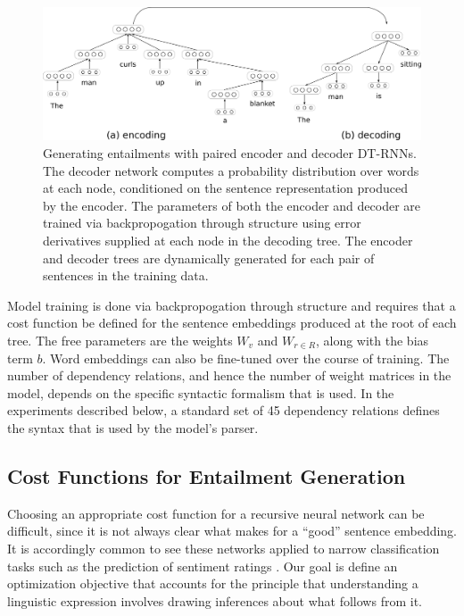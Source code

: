 \documentclass[utf8]{frontiersSCNS} %
\begin{document}
\begin{figure}[t]
\begin{center}
\includegraphics[width=6.5in]{figures/decoder.png}
\end{center}
\caption{Generating entailments with paired encoder and decoder DT-RNNs. The decoder network computes a probability distribution over words at each node, conditioned on the sentence representation produced by the encoder. The parameters of both the encoder and decoder are trained via backpropogation through structure using error derivatives supplied at each node in the decoding tree. The encoder and decoder trees are dynamically generated for each pair of sentences in the training data.} 
\label{decoder}
\end{figure}

Model training is done via backpropogation through structure \citep{Goller:1996} and requires that a cost function be defined for the sentence embeddings produced at the root of each tree. The free parameters are the weights $W_v$ and $W_{r \in R}$, along with the bias term $b$. Word embeddings can also be fine-tuned over the course of training. The number of dependency relations, and hence the number of weight matrices in the model, depends on the specific syntactic formalism that is used. In the experiments described below, a standard set of 45 dependency relations defines the syntax that is used by the model's parser. 

\subsection{Cost Functions for Entailment Generation}

Choosing an appropriate cost function for a recursive neural network can be difficult, since it is not always clear what makes for a ``good'' sentence embedding. It is accordingly common to see these networks applied to narrow classification tasks such as the prediction of sentiment ratings \citep[e.g.][]{Socher:2012}. Our goal is define an optimization objective that accounts for the principle that understanding a linguistic expression involves drawing inferences about what follows from it.  
\end{document}
